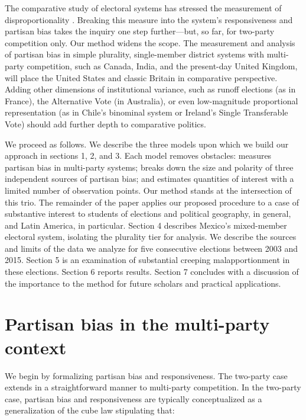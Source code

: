 \documentclass[letter,12pt]{article}
\begin{document}
The comparative study of electoral systems has stressed the measurement of disproportionality \citep{lijphartElSysPtySys.1994}. Breaking this measure into the system's responsiveness and partisan bias takes the inquiry one step further---but, so far, for two-party competition only. Our method widens the scope. The measurement and analysis of partisan bias in simple plurality, single-member district systems with multi-party competition, such as Canada, India, and the present-day United Kingdom, will place the United States and classic Britain in comparative perspective. Adding other dimensions of institutional variance, such as runoff elections (as in France), the Alternative Vote (in Australia), or even low-magnitude proportional representation (as in Chile's binominal system or Ireland's Single Transferable Vote) should add further depth to comparative politics. 

We proceed as follows. We describe the three models upon which we build our approach in sections 1, 2, and 3. Each model removes obstacles: \citet{king.1990elRespBiasMultiparty} measures partisan bias in multi-party systems; \citet{grofman.etalBiasMalapp.1997} breaks down the size and polarity of three independent sources of partisan bias; and \citet{linzerSeatVoteElasticity2012} estimates quantities of interest with a limited number of observation points. Our method stands at the intersection of this trio. The remainder of the paper applies our proposed procedure to a case of substantive interest to students of elections and political geography, in general, and Latin America, in particular. Section 4 describes Mexico's mixed-member electoral system, isolating the plurality tier for analysis. We describe the sources and limits of the data we analyze for five consecutive elections between 2003 and 2015. Section 5 is an examination of substantial creeping malapportionment in these elections. Section 6 reports results. Section 7 concludes with a discussion of the importance to the method for future scholars and practical applications. 

\section{Partisan bias in the multi-party context}\label{S:bias}

We begin by formalizing partisan bias and responsiveness. The two-party case \citep{taagepera.CubeLaw.1973,tufte1973seatsVotes,king.browning1987biasRespUS} extends in a straightforward manner to multi-party competition. In the two-party case, partisan bias and responsiveness are typically conceptualized as a generalization of the cube law stipulating that:
\end{document}

